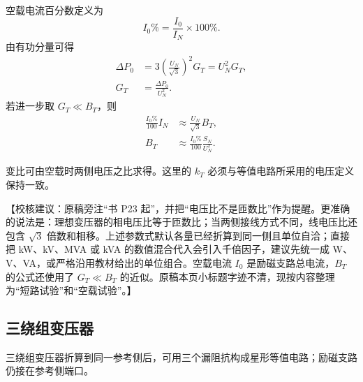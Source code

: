 \documentclass[
  12pt,
  UTF8,
  a4paper,
  fontset=fandol,
  oneside,
  openany
]{ctexrep}
\newcommand{\reviewnote}[1]{%
  \par\smallskip
  {\color{reviewgray}\small\noindent【校核建议：#1】\par}
  \smallskip
}
\begin{document}
空载电流百分数定义为
\begin{equation}
  I_0\%=\frac{I_0}{I_N}\times100\% .
\end{equation}
由有功分量可得
\begin{align}
  \Delta P_0 & =3\left(\frac{U_N}{\sqrt{3}}\right)^2G_T=U_N^2G_T, \\
  G_T        & =\frac{\Delta P_0}{U_N^2}.
\end{align}
若进一步取 $G_T\ll B_T$，则
\begin{align}
  \frac{I_0\%}{100}I_N & \approx\frac{U_N}{\sqrt{3}}B_T,            \\
  B_T                  & \approx\frac{I_0\%}{100}\frac{S_N}{U_N^2}.
\end{align}

变比可由空载时两侧电压之比求得。这里的 $k_T$ 必须与等值电路所采用的电压定义保持一致。

\reviewnote{原稿旁注“书 P23 起”，并把“电压比不是匝数比”作为提醒。更准确的说法是：理想变压器的相电压比等于匝数比；当两侧接线方式不同，线电压比还包含 $\sqrt{3}$ 倍数和相移。上述参数式默认各量已经折算到同一侧且单位自洽；直接把 kW、kV、MVA 或 kVA 的数值混合代入会引入千倍因子，建议先统一成 W、V、VA，或严格沿用教材给出的单位组合。空载电流 $I_0$ 是励磁支路总电流，$B_T$ 的公式还使用了 $G_T\ll B_T$ 的近似。原稿本页小标题字迹不清，现按内容整理为“短路试验”和“空载试验”。}

\subsection{三绕组变压器}

三绕组变压器折算到同一参考侧后，可用三个漏阻抗构成星形等值电路；励磁支路仍接在参考侧端口。
\end{document}

